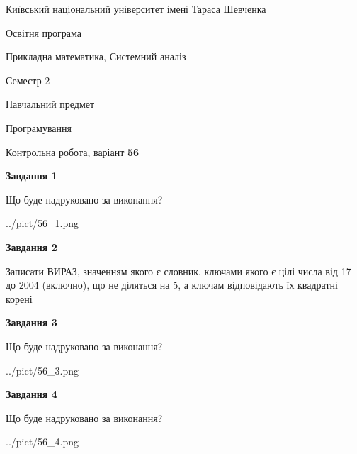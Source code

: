 \documentclass[12pt, ukrainian]{article}
\begin{document}
{{\begin {small}\par
{ \center  Київський національний університет імені Тараса Шевченка \par}
{\parbox {5 cm}{Освітня програма \hfill}{\parbox {8 cm}{Прикладна математика, Системний аналіз \hfill}}\parbox {5 cm}{\hfill Семестр 2}}\par
{\parbox {5 cm} {Навчальний предмет \hfill}\parbox {7 cm}{Програмування \hfill}\parbox {6cm}{\hfill}\par}\vspace{-7pt} \end{small}}{\center Контрольна робота, варіант  \No \textbf
{ 56 }\par}}
{
\begin {large}
{\begin {center}\textbf{Завдання 1}\end {center}}\par
Що буде надруковано за виконання?\par\par
\begin{center}
	{../pict/56_1.png}
\end{center}
\newpage

{\begin {center}\textbf{Завдання 2}\end {center}}\par
Записати ВИРАЗ, значенням якого є словник, ключами якого є цілі числа від 17 до 2004 (включно), що не діляться на 5, а ключам відповідають їх квадратні корені\par
\newpage

{\begin {center}\textbf{Завдання 3}\end {center}}\par
Що буде надруковано за виконання?
\begin{center}
	{../pict/56_3.png}
\end{center}
\newpage

{\begin {center}\textbf{Завдання 4}\end {center}}\par
Що буде надруковано за виконання?\par
\begin{center}
	{../pict/56_4.png}
\end{center}
\newpage


\end{large}}
\end{document}
